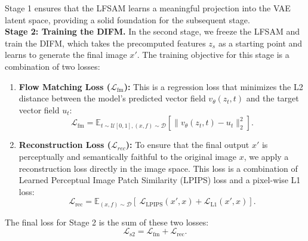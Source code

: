 Stage 1 ensures that the LFSAM learns a meaningful projection into the VAE latent space, providing a solid foundation for the subsequent stage. \\
\textbf{Stage 2: Training the DIFM.}
In the second stage, we freeze the LFSAM and train the DIFM, which takes the precomputed features $z_s$ as a starting point and learns to generate the final image $x'$. 
The training objective for this stage is a combination of two losses:

\begin{enumerate}
    \item \textbf{Flow Matching Loss ($\mathcal{L}_{\text{fm}}$):} 
    This is a regression loss that minimizes the L2 distance between the model's predicted vector field $v_\theta(z_t,t)$ and the target vector field $u_t$:
    \begin{equation}
    \mathcal{L}_{\text{fm}} = \mathbb{E}_{t \sim \mathcal{U}[0,1], (x,f) \sim \mathcal{D}} \left[ \| v_\theta(z_t,t) - u_t \|_2^2 \right].
    \end{equation}

    \item \textbf{Reconstruction Loss ($\mathcal{L}_{rec}$):} To ensure that the final output $x'$ is perceptually and semantically faithful to the original image $x$, we apply a reconstruction loss directly in the image space. 
    This loss is a combination of Learned Perceptual Image Patch Similarity (LPIPS) \cite{zhang2018unreasonable} loss and a pixel-wise L1 loss:
    \begin{equation}
    \label{eq-rec}
    \mathcal{L}_{\text{rec}} = \mathbb{E}_{(x,f) \sim \mathcal{D}} \left[\ \mathcal{L}_{\text{LPIPS}}(x', x) + \mathcal{L}_{\text{L1}}(x', x) \right].
    \end{equation}
\end{enumerate}



The final loss for Stage 2 is the sum of these two losses:
\begin{equation}
\label{eq-all}
\mathcal{L}_{\text{s2}} = \mathcal{L}_{\text{fm}} + \mathcal{L}_{\text{rec}}.
\end{equation}



